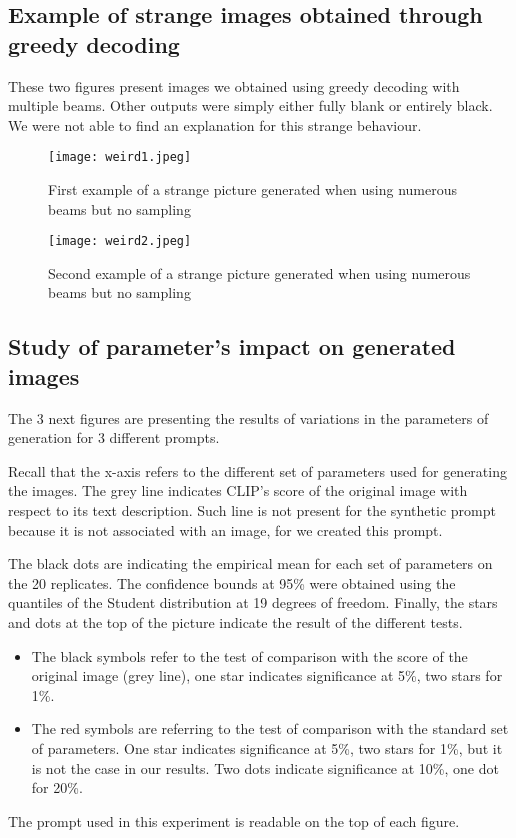 \documentclass{article}
\begin{document}
\begin{appendix}
\subsection{Example of strange images obtained through greedy decoding}
\label{app:greedy-images}

These two figures present images we obtained using greedy decoding with multiple beams. Other outputs were simply either fully blank or entirely black. We were not able to find an explanation for this strange behaviour. 

\begin{figure}[H]
    \centering
    \texttt{[image: weird1.jpeg]}
    \caption{First example of a strange picture generated when using numerous beams but no sampling}
    \label{fig:gen-weird1}
\end{figure}

\begin{figure}[H]
    \centering
    \texttt{[image: weird2.jpeg]}
    \caption{Second example of a strange picture generated when using numerous beams but no sampling}
    \label{fig:gen-weird2}
\end{figure}

\pagebreak

\subsection{Study of parameter's impact on generated images}
\label{app:other-gen-param}

The 3 next figures are presenting the results of variations in the parameters of generation for 3 different prompts.

Recall that the x-axis refers to the different set of parameters used for generating the images. The grey line indicates CLIP's score of the original image with respect to its text description. Such line is not present for the synthetic prompt because it is not associated with an image, for we created this prompt. 

The black dots are indicating the empirical mean for each set of parameters on the 20 replicates. The confidence bounds at 95\% were obtained using the quantiles of the Student distribution at 19 degrees of freedom. 
Finally, the stars and dots at the top of the picture indicate the result of the different tests. 
\begin{itemize}
    \item The black symbols refer to the test of comparison with the score of the original image (grey line), one star indicates significance at 5\%, two stars for 1\%.
    \item  The red symbols are referring to the test of comparison with the standard set of parameters. One star indicates significance at 5\%, two stars for 1\%, but it is not the case in our results. Two dots indicate significance at 10\%, one dot for 20\%. 
\end{itemize}
The prompt used in this experiment is readable on the top of each figure.


\end{appendix}
\end{document}
